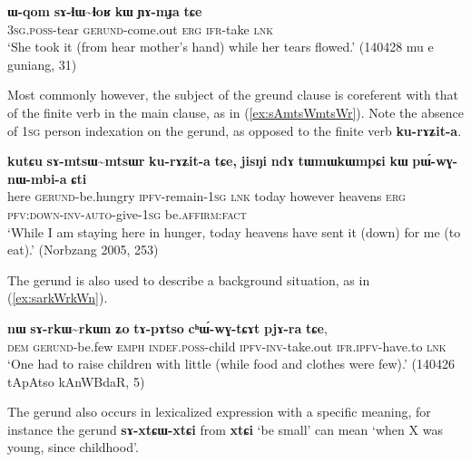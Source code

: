 \documentclass[oneside,a4paper,11pt]{article}
\newcommand{\ipa}[1]{\textbf{{\phon\mbox{#1}}}} %
\begin{document}
\begin{exe}
\ex \label{ex:sAlhWlhWoR}
\gll  \ipa{ɯ-qom} \ipa{sɤ-ɬɯ\textasciitilde{}ɬoʁ} \ipa{kɯ} \ipa{ɲɤ-mɟa} \ipa{tɕe} \\
\textsc{3sg}.\textsc{poss}-tear  \textsc{gerund}-come.out \textsc{erg} \textsc{ifr}-take \textsc{lnk} \\
\glt  `She took it (from hear mother's hand) while her tears flowed.' (140428 mu e guniang, 31)
\end{exe}


Most commonly however, the subject of the greund clause is coreferent with that of the finite verb in the main clause, as in (\ref{ex:sAmtsWmtsWr}). Note the absence of \textsc{1sg} person indexation on the gerund, as opposed to the finite verb \ipa{ku-rɤʑit-a}.

\begin{exe}
\ex \label{ex:sAmtsWmtsWr}
\gll  \ipa{kutɕu}  	\ipa{sɤ-mtsɯ\textasciitilde{}mtsɯr}  	\ipa{ku-rɤʑit-a}  	\ipa{tɕe,}  	\ipa{jisŋi}  	\ipa{ndɤ}  	\ipa{tɯmɯkɯmpɕi}  	\ipa{kɯ}  	\ipa{pɯ́-wɣ-nɯ-mbi-a}  	\ipa{ɕti}  \\
 here \textsc{gerund}-be.hungry \textsc{ipfv}-remain-\textsc{1sg} \textsc{lnk} today however heavens \textsc{erg} \textsc{pfv:down-inv-auto}-give-\textsc{1sg} be.\textsc{affirm}:\textsc{fact} \\
\glt `While I am staying here in hunger, today heavens have sent it (down) for  me (to eat).' (Norbzang 2005, 253)
\end{exe}

The gerund is also used to describe a background situation, as in (\ref{ex:sarkWrkWn}).

 \begin{exe}
\ex \label{ex:sarkWrkWn}
\gll 
\ipa{nɯ} \ipa{sɤ-rkɯ\textasciitilde{}rkɯn} \ipa{ʑo} \ipa{tɤ-pɤtso} \ipa{cʰɯ́-wɣ-tɕɤt} \ipa{pjɤ-ra} \ipa{tɕe},  \\
\textsc{dem} \textsc{gerund}-be.few \textsc{emph} \textsc{indef}.\textsc{poss}-child \textsc{ipfv}-\textsc{inv}-take.out \textsc{ifr}.\textsc{ipfv}-have.to \textsc{lnk} \\
\glt `One had to raise children with little (while food and clothes were few).' (140426 tApAtso kAnWBdaR, 5)
\end{exe}

The gerund also occurs in lexicalized expression with a specific meaning, for instance the gerund \ipa{sɤ-xtɕɯ-xtɕi} from \ipa{xtɕi} `be small' can mean `when X was young, since childhood'.
\end{document}
